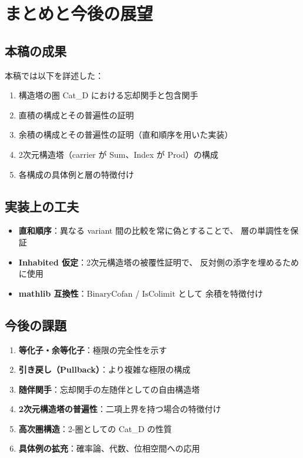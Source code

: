 \documentclass[a4paper,11pt]{ltjsarticle}
\theoremstyle{definition}
\begin{document}
\section{まとめと今後の展望}

\subsection{本稿の成果}

本稿では以下を詳述した：
\begin{enumerate}
  \item 構造塔の圏 Cat\_D における忘却関手と包含関手
  \item 直積の構成とその普遍性の証明
  \item 余積の構成とその普遍性の証明（直和順序を用いた実装）
  \item 2次元構造塔（carrier が Sum、Index が Prod）の構成
  \item 各構成の具体例と層の特徴付け
\end{enumerate}

\subsection{実装上の工夫}

\begin{itemize}
  \item \textbf{直和順序}：異なる variant 間の比較を常に偽とすることで、
    層の単調性を保証
  \item \textbf{Inhabited 仮定}：2次元構造塔の被覆性証明で、
    反対側の添字を埋めるために使用
  \item \textbf{mathlib 互換性}：$\mathrm{BinaryCofan}$ / $\mathrm{IsColimit}$ として
    余積を特徴付け
\end{itemize}

\subsection{今後の課題}

\begin{enumerate}
  \item \textbf{等化子・余等化子}：極限の完全性を示す
  \item \textbf{引き戻し（Pullback）}：より複雑な極限の構成
  \item \textbf{随伴関手}：忘却関手の左随伴としての自由構造塔
  \item \textbf{2次元構造塔の普遍性}：二項上界を持つ場合の特徴付け
  \item \textbf{高次圏構造}：2-圏としての Cat\_D の性質
  \item \textbf{具体例の拡充}：確率論、代数、位相空間への応用
\end{enumerate}
\end{document}
